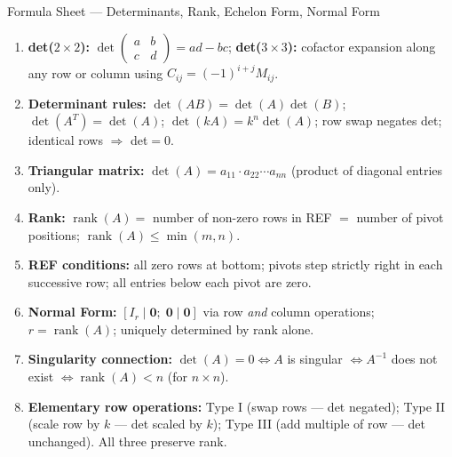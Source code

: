 \documentclass[12pt,a4paper]{article}
\begin{document}
\begin{learnbox}{Formula Sheet --- Determinants, Rank, Echelon Form, Normal Form}
\begin{enumerate}[label=$\bullet$]
  \item \textbf{det($2\times2$):} $\det\begin{pmatrix}a&b\\c&d\end{pmatrix}=ad-bc$; \textbf{det($3\times3$):} cofactor expansion along any row or column using $C_{ij}=(-1)^{i+j}M_{ij}$.
  \item \textbf{Determinant rules:} $\det(AB)=\det(A)\det(B)$; $\det(A^T)=\det(A)$; $\det(kA)=k^n\det(A)$; row swap negates det; identical rows $\Rightarrow$ det$=0$.
  \item \textbf{Triangular matrix:} $\det(A)=a_{11}\cdot a_{22}\cdots a_{nn}$ (product of diagonal entries only).
  \item \textbf{Rank:} $\operatorname{rank}(A)=$ number of non-zero rows in REF $=$ number of pivot positions; $\operatorname{rank}(A)\leq\min(m,n)$.
  \item \textbf{REF conditions:} all zero rows at bottom; pivots step strictly right in each successive row; all entries below each pivot are zero.
  \item \textbf{Normal Form:} $[I_r\mid\mathbf{0};\;\mathbf{0}\mid\mathbf{0}]$ via row \emph{and} column operations; $r=\operatorname{rank}(A)$; uniquely determined by rank alone.
  \item \textbf{Singularity connection:} $\det(A)=0 \Leftrightarrow A$ is singular $\Leftrightarrow A^{-1}$ does not exist $\Leftrightarrow \operatorname{rank}(A)<n$ (for $n\times n$).
  \item \textbf{Elementary row operations:} Type I (swap rows --- det negated); Type II (scale row by $k$ --- det scaled by $k$); Type III (add multiple of row --- det unchanged). All three preserve rank.
\end{enumerate}
\end{learnbox}
\end{document}
